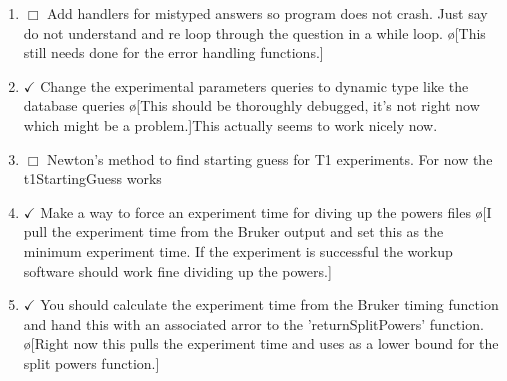 \documentclass[10pt]{book}
\begin{document}
\begin{enumerate}
    \item $\Box$ Add handlers for mistyped answers so program does not crash. Just say do not understand and re loop through the question in a while loop. \o[This still needs done for the error handling functions.]{}
    \item $\checkmark$ Change the experimental parameters queries to dynamic type like the database queries \o[This should be thoroughly debugged, it's not right now which might be a problem.]{This actually seems to work nicely now.}
    \item $\Box$ Newton's method to find starting guess for T1 experiments. For now the t1StartingGuess works 
    \item $\checkmark$ Make a way to force an experiment time for diving up the powers files \o[I pull the experiment time from the Bruker output and set this as the minimum experiment time. If the experiment is successful the workup software should work fine dividing up the powers.]{}
    \item $\checkmark$ You should calculate the experiment time from the Bruker timing function and hand this with an associated arror to the 'returnSplitPowers' function. \o[Right now this pulls the experiment time and uses as a lower bound for the split powers function.]{}
\end{enumerate}
\end{document}
